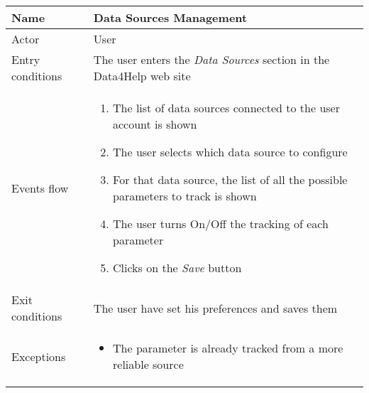 \begin{table}[h!]
    \begin{tabular}{|l|p{12cm}|}
        \hline
        Name             & Data Sources Management \\ \hline
        Actor            & User \\ \hline
        Entry conditions & The user enters the \textit{Data Sources} section in the Data4Help web site \\ \hline
        Events flow      & 
        \begin{enumerate}
            \item The list of data sources connected to the user account is shown
            \item The user selects which data source to configure
            \item For that data source, the list of all the possible parameters to track is shown
            \item The user turns On/Off the tracking of each parameter
            \item Clicks on the \textit{Save} button
        \end{enumerate} \\ \hline
        Exit conditions  & The user have set his preferences and saves them \\ \hline
        Exceptions       & 
        \begin{itemize}
            \item The parameter is already tracked from a more reliable source
        \end{itemize} \\ \hline
    \end{tabular}
\end{table}

